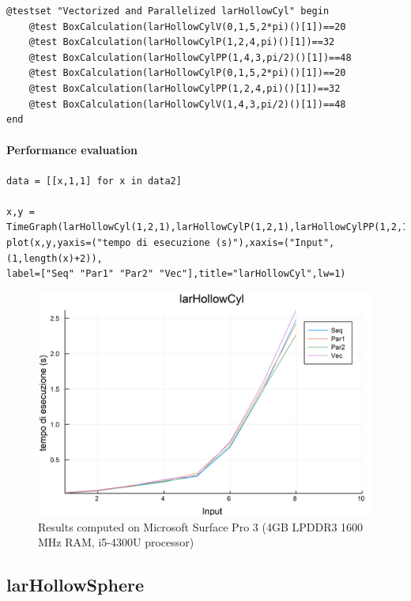 \documentclass{article}
\begin{document}
\begin{Verbatim}
@testset "Vectorized and Parallelized larHollowCyl" begin
    @test BoxCalculation(larHollowCylV(0,1,5,2*pi)()[1])==20
    @test BoxCalculation(larHollowCylP(1,2,4,pi)()[1])==32
    @test BoxCalculation(larHollowCylPP(1,4,3,pi/2)()[1])==48
    @test BoxCalculation(larHollowCylP(0,1,5,2*pi)()[1])==20
    @test BoxCalculation(larHollowCylPP(1,2,4,pi)()[1])==32
    @test BoxCalculation(larHollowCylV(1,4,3,pi/2)()[1])==48
end
\end{Verbatim}

\paragraph{Performance evaluation}

\begin{Verbatim}
data = [[x,1,1] for x in data2]

x,y = TimeGraph(larHollowCyl(1,2,1),larHollowCylP(1,2,1),larHollowCylPP(1,2,1),larHollowCylV(1,2,1),data,5)
plot(x,y,yaxis=("tempo di esecuzione (s)"),xaxis=("Input",(1,length(x)+2)),
label=["Seq" "Par1" "Par2" "Vec"],title="larHollowCyl",lw=1)

\end{Verbatim}

\begin{figure}[htbp] 
\centering 
\includegraphics[scale=.13]{larHollowCylTime.png} 
\caption{Results computed on Microsoft Surface Pro  3 (4GB LPDDR3 1600 MHz RAM, i5-4300U processor)} 
\end{figure}
\subsection{larHollowSphere}
\end{document}
